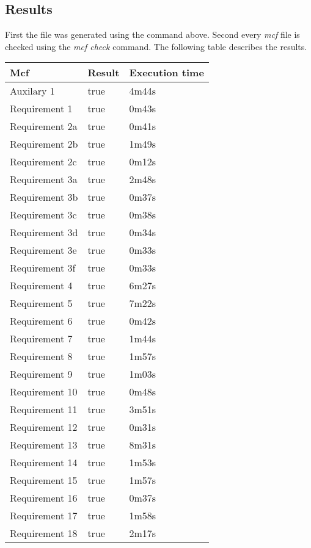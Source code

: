 \subsection{Results}
First the  file was generated using the  command above. Second every \textit{mcf} file is checked using the \textit{mcf check} command. The following table describes the results.
\begin{table}[h]
\label{my-label}
\begin{tabular}{|l|l|l|}
\hline
\textbf{Mcf} & \textbf{Result} & \textbf{Execution time} \\ \hline
Auxilary 1 & true & 4m44s \\ \hline
Requirement 1 & true & 0m43s \\ \hline
Requirement 2a & true & 0m41s \\ \hline
Requirement 2b & true & 1m49s \\ \hline
Requirement 2c & true & 0m12s \\ \hline
Requirement 3a & true & 2m48s \\ \hline
Requirement 3b & true & 0m37s \\ \hline
Requirement 3c & true & 0m38s \\ \hline
Requirement 3d & true & 0m34s \\ \hline
Requirement 3e & true & 0m33s \\ \hline
Requirement 3f & true & 0m33s \\ \hline
Requirement 4 & true & 6m27s \\ \hline
Requirement 5 & true & 7m22s \\ \hline
Requirement 6 & true & 0m42s \\ \hline
Requirement 7 & true & 1m44s \\ \hline
Requirement 8 & true & 1m57s \\ \hline
Requirement 9 & true & 1m03s \\ \hline
Requirement 10 & true & 0m48s \\ \hline
Requirement 11 & true & 3m51s \\ \hline
Requirement 12 & true & 0m31s \\ \hline
Requirement 13 & true & 8m31s \\ \hline
Requirement 14 & true & 1m53s \\ \hline
Requirement 15 & true & 1m57s \\ \hline
Requirement 16 & true & 0m37s \\ \hline
Requirement 17 & true & 1m58s \\ \hline
Requirement 18 & true & 2m17s \\ \hline
\end{tabular}
\end{table}
